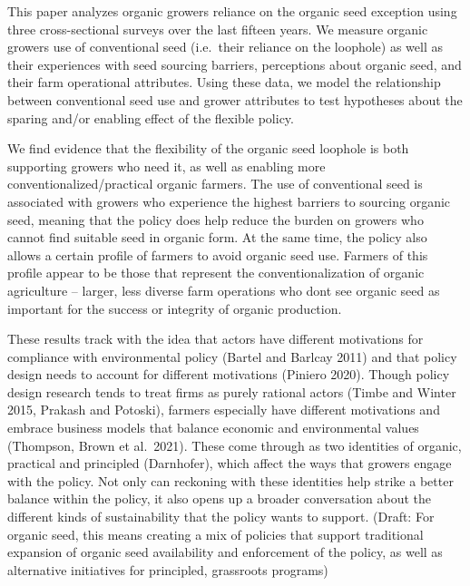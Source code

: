 \documentclass[twoside,12pt,final]{ucthesis-CA2012}
\begin{document}
\begin{ucmainmatter}
This paper analyzes organic growers\textquotesingle{} reliance on the organic seed
exception using three cross-sectional surveys over the last fifteen
years. We measure organic growers\textquotesingle{} use of conventional seed (i.e.~their
reliance on the loophole) as well as their experiences with seed
sourcing barriers, perceptions about organic seed, and their farm
operational attributes. Using these data, we model the relationship
between conventional seed use and grower attributes to test hypotheses
about the sparing and/or enabling effect of the flexible policy.

We find evidence that the flexibility of the organic seed loophole is
both supporting growers who need it, as well as enabling more
\textquotesingle conventionalized\textquotesingle/\textquotesingle practical\textquotesingle{} organic farmers. The use of
conventional seed is associated with growers who experience the highest
barriers to sourcing organic seed, meaning that the policy does help
reduce the burden on growers who cannot find suitable seed in organic
form. At the same time, the policy also allows a certain profile of
farmers to avoid organic seed use. Farmers of this profile appear to be
those that represent the \textquotesingle conventionalization\textquotesingle{} of organic agriculture
-- larger, less diverse farm operations who don\textquotesingle t see organic seed as
important for the success or integrity of organic production.

These results track with the idea that actors have different motivations
for compliance with environmental policy (Bartel and Barlcay 2011) and
that policy design needs to account for different motivations (Piniero
2020). Though policy design research tends to treat firms as purely
rational actors (Timbe and Winter 2015, Prakash and Potoski), farmers
especially have different motivations and embrace business models that
balance economic and environmental values (Thompson, Brown et al.~2021).
These come through as two identities of organic, practical and
principled (Darnhofer), which affect the ways that growers engage with
the policy. Not only can reckoning with these identities help strike a
better balance within the policy, it also opens up a broader
conversation about the different kinds of \textquotesingle sustainability\textquotesingle{} that the
policy wants to support. (Draft: For organic seed, this means creating a
mix of policies that support traditional expansion of organic seed
availability and enforcement of the policy, as well as alternative
initiatives for principled, grassroots programs)


\end{ucmainmatter}
\end{document}
